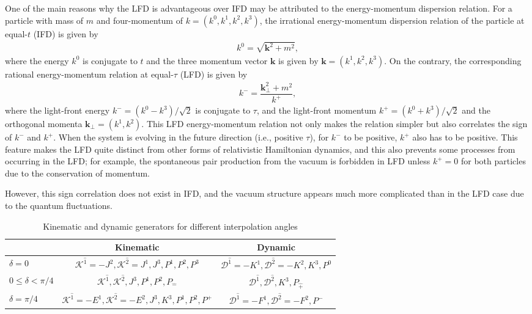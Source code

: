 \documentclass[aps,reprint,notitlepage,nofootinbib,superscriptaddress]{revtex4-1}
\newcommand{\pT}{\hat{+}}
\newcommand{\mT}{\hat{-}}
\begin{document}
One of the main reasons why the LFD is advantageous over IFD may be attributed to the energy-momentum dispersion relation. For a particle with mass of $m$ and four-momentum of $k=(k^{0},k^{1},k^{2},k^{3})$, the irrational energy-momentum dispersion relation of the particle at equal-$t$ (IFD) is given by
\begin{align}
  k^{0}=\sqrt{\mathbf{k}^{2}+m^{2}}, \label{eqn:E-P_relation_IF}
\end{align}
where the energy $k^{0}$ is conjugate to $t$ and the three momentum vector $\mathbf{k}$ is given by $\mathbf{k}=(k^{1},k^{2},k^{3})$.
On the contrary, the corresponding rational energy-momentum relation at equal-$\tau$ (LFD) is given by
\begin{align}
  k^{-}=\dfrac{\mathbf{k}_{\perp}^{2}+m^{2}}{k^{+}}, \label{eqn:E-P_relation_LF}
\end{align}
where the light-front energy $k^{-}=(k^{0}-k^{3})/\sqrt{2}$ is conjugate to $\tau$, and the light-front momentum $k^{+}=(k^{0}+k^{3})/\sqrt{2}$ and the orthogonal momenta $\mathbf{k}_{\perp}=(k^{1},k^{2})$. This LFD energy-momentum relation not only makes the relation simpler but also correlates the sign of $k^{-}$ and $k^{+}$.
When the system is evolving in the future direction (i.e., positive $\tau$), for $k^{-}$ to be positive, $k^{+}$ also has to be positive. This feature makes the LFD quite distinct from other forms of relativistic Hamiltonian dynamics, and this also prevents some processes from occurring in the LFD; for example, the spontaneous pair production from the vacuum is forbidden in LFD unless $k^{+}=0$ for both particles due to the conservation of momentum.

However, this sign correlation does not exist in IFD, and the vacuum structure appears much more complicated than in the LFD case due to the quantum fluctuations. 

\begin{table*}[t]
  \caption{\label{tab:Kinematic_and_dynamic_generators_for_different_interoplation_angles}Kinematic and dynamic generators for different interpolation angles \cite{Ji2001, Ji2012}}
    \begin{ruledtabular}
      \begin{tabular}{lcc}
	& Kinematic & Dynamic \\
	\hline
	\rule{0pt}{3ex} $\delta=0$ & $\mathcal{K}^{\hat{1}}=-J^{2}, \mathcal{K}^{\hat{2}}=J^{1}, J^{3}, P^{1}, P^{2}, P^{3}$ & $\mathcal{D}^{\hat{1}}=-K^{1}, \mathcal{D}^{\hat{2}}=-K^{2}, K^{3}, P^{0}$\\
	$0\leq\delta<\pi/4$ & $\mathcal{K}^{\hat{1}}, \mathcal{K}^{\hat{2}}, J^{3}, P^{1}, P^{2}, P_{\mT}$ & $\mathcal{D}^{\hat{1}}, \mathcal{D}^{\hat{2}}, K^{3}, P_{\pT}$\\
	$\delta=\pi/4$ & $\mathcal{K}^{\hat{1}}=-E^{1}, \mathcal{K}^{\hat{2}}=-E^{2}, J^{3}, K^{3}, P^{1}, P^{2}, P^{+}$ & $\mathcal{D}^{\hat{1}}=-F^{1}, \mathcal{D}^{\hat{2}}=-F^{2}, P^{-}$\\
      \end{tabular}
    \end{ruledtabular}
\end{table*}
\end{document}
